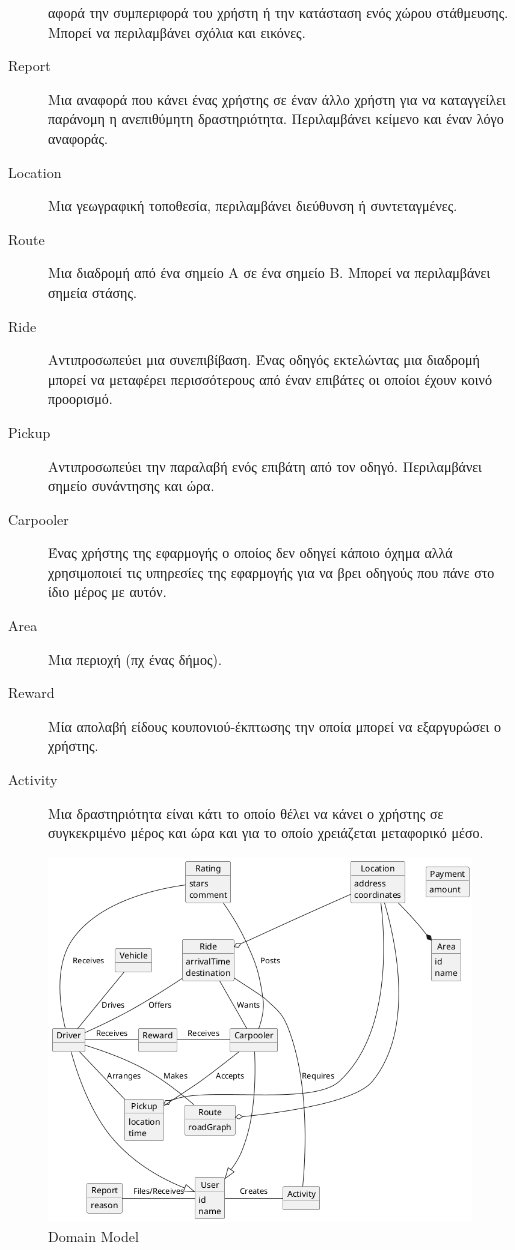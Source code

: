 \documentclass[11pt]{article}
\begin{document}
\begin{description}
        αφορά την συμπεριφορά του χρήστη ή την κατάσταση ενός χώρου
        στάθμευσης. Μπορεί να περιλαμβάνει σχόλια και εικόνες.
    \item[Report]
        Μια αναφορά που κάνει ένας χρήστης σε έναν άλλο χρήστη για να
        καταγγείλει παράνομη η ανεπιθύμητη δραστηριότητα. Περιλαμβάνει
        κείμενο και έναν λόγο αναφοράς.
    \item[Location]
        Μια γεωγραφική τοποθεσία, περιλαμβάνει διεύθυνση ή συντεταγμένες.
    \item[Route]
        Μια διαδρομή από ένα σημείο Α σε ένα σημείο Β. Μπορεί να περιλαμβάνει
        σημεία στάσης.
    \item[Ride]
        Αντιπροσωπεύει μια συνεπιβίβαση. Ένας οδηγός εκτελώντας μια διαδρομή
        μπορεί να μεταφέρει περισσότερους από έναν επιβάτες οι οποίοι έχουν
        κοινό προορισμό.
    \item[Pickup]
        Αντιπροσωπεύει την παραλαβή ενός επιβάτη από τον οδηγό. Περιλαμβάνει
        σημείο συνάντησης και ώρα.
    \item[Carpooler]
        Ένας χρήστης της εφαρμογής ο οποίος δεν οδηγεί κάποιο όχημα αλλά
        χρησιμοποιεί τις υπηρεσίες της εφαρμογής για να βρει οδηγούς που πάνε
        στο ίδιο μέρος με αυτόν.
    \item[Area]
        Μια περιοχή (πχ ένας δήμος).
    \item[Reward]
        Μία απολαβή είδους κουπονιού-έκπτωσης την οποία μπορεί να εξαργυρώσει
        ο χρήστης.
    \item[Activity]
        Μια δραστηριότητα είναι κάτι το οποίο θέλει να κάνει ο χρήστης σε
        συγκεκριμένο μέρος και ώρα και για το οποίο χρειάζεται μεταφορικό μέσο.
\end{description}

\begin{figure}
    \centering
    \includegraphics[width=\textwidth]{uml/domain-model}
    \caption{Domain Model}
\end{figure}
\end{document}
